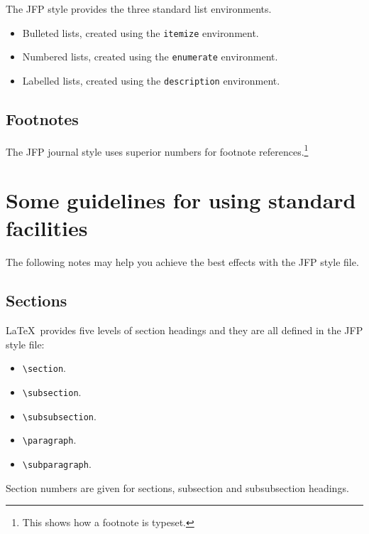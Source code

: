 \documentclass{jfp}
\begin{document}
The JFP style provides the three standard list environments.
\begin{itemize}
  \item Bulleted lists, created using the \verb"itemize" environment.
  \item Numbered lists, created using the \verb"enumerate" environment.
  \item Labelled lists, created using the \verb"description" environment.
\end{itemize}

\subsection{Footnotes}

The JFP journal style uses superior numbers for footnote
references.\footnote{This shows how a footnote is typeset.}

\section{Some guidelines for using standard facilities}

The following notes may help you achieve the best effects with the JFP style
file.

\subsection{Sections}

LaTeX\ provides five levels of section headings and they are all
defined in the JFP style file:
\begin{itemize}
  \item \verb"\section".
  \item \verb"\subsection".
  \item \verb"\subsubsection".
  \item \verb"\paragraph".
  \item \verb"\subparagraph".
\end{itemize}
Section numbers are given for sections, subsection and subsubsection headings.
\end{document}
